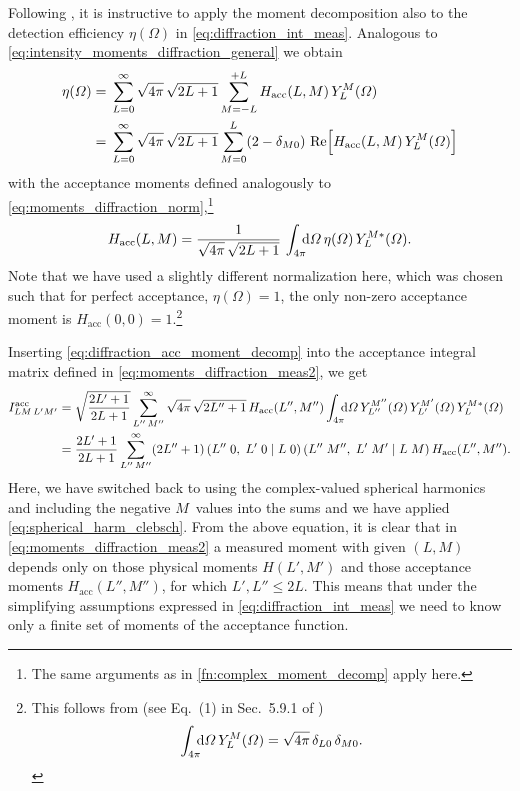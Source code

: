 Following , it is instructive to apply the
moment decomposition also to the detection efficiency $\eta(\Omega)$
in \cref{eq:diffraction_int_meas}.  Analogous to
\cref{eq:intensity_moments_diffraction_general} we obtain
\begin{align}
  \label{eq:diffraction_acc_moment_decomp}
  \eta(\Omega)
  ={}& \sum_{L = 0}^\infty \sqrt{4 \pi}\, \sqrt{2 L + 1} \sum_{M = -L}^{+L} H_\text{acc}(L, M)\, Y_L^M(\Omega)
  \\
  ={}& \sum_{L = 0}^\infty \sqrt{4 \pi}\, \sqrt{2 L + 1} \sum_{M = 0}^{L} (2 - \delta_{M 0})\, \Re\!\sBrk{H_\text{acc}(L, M)\, Y_L^M(\Omega)}
\end{align}
with the acceptance moments defined analogously to
\cref{eq:moments_diffraction_norm},\footnote{The same arguments as in
\cref{fn:complex_moment_decomp} apply here.} \ie
\begin{equation}
  \label{eq:diffraction_acc_moment}
  H_\text{acc}(L, M)
  = \frac{1}{\sqrt{4 \pi}\, \sqrt{2 L + 1}}\, \int_{4 \pi}\!\!\! \dif{\Omega}\, \eta(\Omega)\, Y_L^{M *}(\Omega).
\end{equation}
Note that we have used a slightly different normalization here, which
was chosen such that for perfect acceptance, \ie $\eta(\Omega) = 1$,
the only non-zero acceptance moment is $H_\text{acc}(0, 0) =
1$.\footnote{%
  This follows from (see Eq.~(1) in Sec.~5.9.1 of
  )
  \begin{equation}
    \int_{4 \pi}\!\!\! \dif{\Omega}\, Y_L^M(\Omega)
    = \sqrt{4 \pi}\, \delta_{L 0}\, \delta_{M 0}.
  \end{equation}
}

Inserting \cref{eq:diffraction_acc_moment_decomp} into the acceptance
integral matrix defined in \cref{eq:moments_diffraction_meas2}, we get
\begin{align}
  I^\text{acc}_{L M\, L' M'}
  ={}& \sqrt{\frac{2 L' + 1}{2 L + 1}} \sum_{L''\, M''}^\infty \sqrt{4 \pi}\, \sqrt{2 L'' + 1}\, H_\text{acc}(L'', M'')
  \int_{4 \pi}\!\!\! \dif{\Omega}\, Y_{L''}^{M''}(\Omega)\, Y_{L'}^{M'}(\Omega)\, Y_L^{M *}(\Omega) \notag
  \\
  \label{eq:diffraction_acc_int_moment_decomp}
  ={}& \frac{2 L' + 1}{2 L + 1} \sum_{L''\, M''}^\infty (2 L'' + 1)\,
  \clebsch{L''}{0}{L'}{0}{L}{0}\, \clebsch{L''}{M''}{L'}{M'}{L}{M}\, H_\text{acc}(L'', M'').
\end{align}
Here, we have switched back to using the complex-valued spherical
harmonics and including the negative $M$~values into the sums and we
have applied \cref{eq:spherical_harm_clebsch}.  From the above
equation, it is clear that in \cref{eq:moments_diffraction_meas2} a
measured moment with given $(L, M)$ depends only on those physical
moments $H(L', M')$ and those acceptance moments $H_\text{acc}(L'',
M'')$, for which $L', L'' \leq 2 L$.  This means that under the
simplifying assumptions expressed in \cref{eq:diffraction_int_meas} we
need to know only a finite set of moments of the acceptance function.


